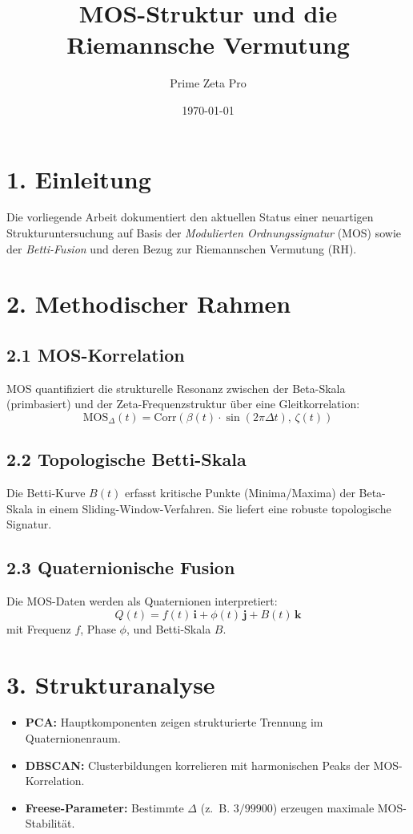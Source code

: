 \documentclass[12pt]{article}
\title{\textbf{MOS-Struktur und die Riemannsche Vermutung}}
\author{Prime Zeta Pro}
\date{\today}
\begin{document}
\maketitle

\section*{1. Einleitung}

Die vorliegende Arbeit dokumentiert den aktuellen Status einer neuartigen Strukturuntersuchung auf Basis der \textit{Modulierten Ordnungssignatur} (MOS) sowie der \textit{Betti-Fusion} und deren Bezug zur Riemannschen Vermutung (RH).

\section*{2. Methodischer Rahmen}

\subsection*{2.1 MOS-Korrelation}
MOS quantifiziert die strukturelle Resonanz zwischen der Beta-Skala (primbasiert) und der Zeta-Frequenzstruktur über eine Gleitkorrelation:
\[
\text{MOS}_\Delta(t) = \text{Corr}\left( \beta(t) \cdot \sin(2\pi\Delta t),\, \zeta(t) \right)
\]

\subsection*{2.2 Topologische Betti-Skala}
Die Betti-Kurve $B(t)$ erfasst kritische Punkte (Minima/Maxima) der Beta-Skala in einem Sliding-Window-Verfahren. Sie liefert eine robuste topologische Signatur.

\subsection*{2.3 Quaternionische Fusion}
Die MOS-Daten werden als Quaternionen interpretiert:
\[
Q(t) = f(t)\,\mathbf{i} + \phi(t)\,\mathbf{j} + B(t)\,\mathbf{k}
\]
mit Frequenz $f$, Phase $\phi$, und Betti-Skala $B$.

\section*{3. Strukturanalyse}

\begin{itemize}
  \item \textbf{PCA:} Hauptkomponenten zeigen strukturierte Trennung im Quaternionenraum.
  \item \textbf{DBSCAN:} Clusterbildungen korrelieren mit harmonischen Peaks der MOS-Korrelation.
  \item \textbf{Freese-Parameter:} Bestimmte $\Delta$ (z.~B. $3/99900$) erzeugen maximale MOS-Stabilität.
\end{itemize}
\end{document}
